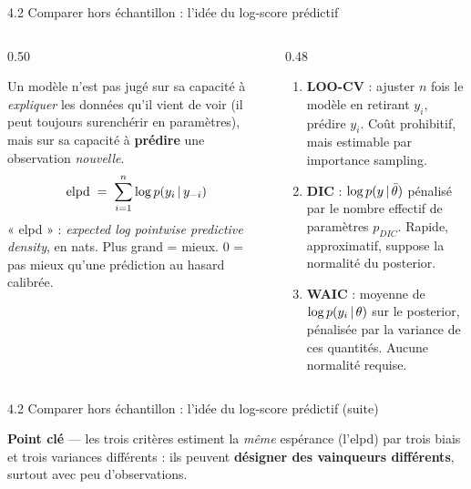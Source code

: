 \begin{frame}{4.2 Comparer hors échantillon : l'idée du log-score prédictif}
\begin{columns}[t]
\begin{column}{0.50\textwidth}
\begin{kbox}[Principe]
Un modèle n'est pas jugé sur sa capacité à \emph{expliquer} les données
qu'il vient de voir (il peut toujours surenchérir en paramètres), mais sur sa
capacité à \textbf{prédire} une observation \emph{nouvelle}.
\[
\text{elpd} \;=\; \sum_{i=1}^{n} \log p(y_i \,\vert\, y_{-i})
\]
« elpd » : \textit{expected log pointwise predictive density}, en nats.
Plus grand = mieux. $0$ = pas mieux qu'une prédiction au hasard calibrée.
\end{kbox}
\end{column}
\begin{column}{0.48\textwidth}
\begin{ebox}
\begin{enumerate}
  \item \textbf{LOO-CV} : ajuster $n$ fois le modèle en retirant $y_i$,
        prédire $y_i$. Coût prohibitif, mais estimable par importance sampling.
  \item \textbf{DIC} : $\log p(y \,\vert\, \bar\theta)$ pénalisé par le nombre
        effectif de paramètres $p_{DIC}$. Rapide, approximatif, suppose la
        normalité du posterior.
  \item \textbf{WAIC} : moyenne de $\log p(y_i \,\vert\, \theta)$ sur le posterior,
        pénalisée par la variance de ces quantités. Aucune normalité requise.
\end{enumerate}
\end{ebox}
\end{column}
\end{columns}
\vspace{1mm}
\end{frame}

\begin{frame}{4.2 Comparer hors échantillon : l'idée du log-score prédictif (suite)}
\begin{tcolorbox}[colback=byCyan!8,colframe=byCyan,arc=2mm,width=.95\textwidth]
\small\centering
\textbf{Point clé} --- les trois critères estiment la \emph{même} espérance
(l'elpd) par trois biais et trois variances différents : ils peuvent
\textbf{désigner des vainqueurs différents}, surtout avec peu d'observations.
\end{tcolorbox}
\end{frame}

